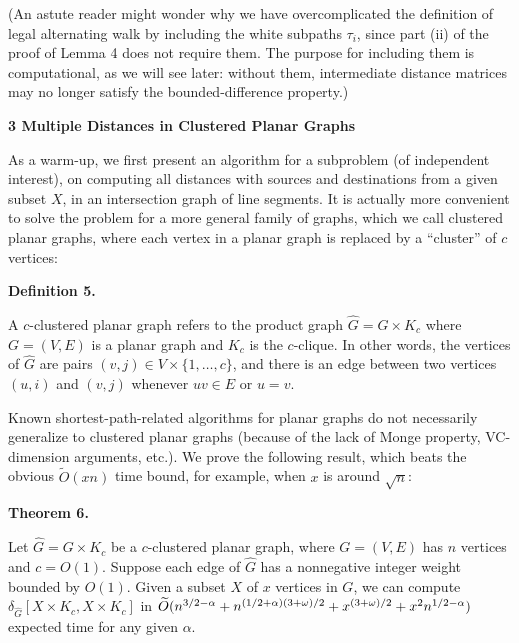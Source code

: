 (An astute reader might wonder why we have overcomplicated the definition of legal alternating walk by including the white subpaths $\tau_{i}$, since part (ii) of the proof of Lemma 4 does not require them. The purpose for including them is computational, as we will see later: without them, intermediate distance matrices may no longer satisfy the bounded-difference property.)
\par
\par
\par\medskip\noindent\textbf{3 Multiple Distances in Clustered Planar Graphs}\par
As a warm-up, we first present an algorithm for a subproblem (of independent interest), on computing all distances with sources and destinations from a given subset $X$, in an intersection graph of line segments. It is actually more convenient to solve the problem for a more general family of graphs, which we call clustered planar graphs, where each vertex in a planar graph is replaced by a “cluster” of $c$ vertices:
\par
\par
\par\medskip\noindent\textbf{Definition 5.}\par
A $c$-clustered planar graph refers to the product graph ${\widehat{G}}=G\times K_{c}$ where $G=(V,E)$ is a planar graph and $K_{c}$ is the $c$-clique. In other words, the vertices of ${\widehat{G}}$ are pairs $(v,j)\in V\times\{1,\ldots,c\}$, and there is an edge between two vertices $(u,i)$ and $(v,j)$ whenever $uv\in E$ or $u=v$.
\par
\par
\par
Known shortest-path-related algorithms for planar graphs do not necessarily generalize to clustered planar graphs (because of the lack of Monge property, VC-dimension arguments, etc.). We prove the following result, which beats the obvious $\widetilde{O}(xn)$ time bound, for example, when $x$ is around $\sqrt{n}$:
\par
\par
\par\medskip\noindent\textbf{Theorem 6.}\par
Let ${\widehat{G}}=G\times K_{c}$ be a $c$-clustered planar graph, where $G=(V,E)$ has $n$ vertices and $c=O(1)$. Suppose each edge of ${\widehat{G}}$ has a nonnegative integer weight bounded by $O(1)$. Given a subset $X$ of $x$ vertices in $G$, we can compute $\delta_{\widehat{G}}[X\times K_{c},X\times K_{c}]$ in $\widetilde{O}(n^{3/2-\alpha}+n^{(1/2+\alpha)(3+\omega)/2}+x^{(3+\omega)/2}+x^{%
2}n^{1/2-\alpha})$ expected time for any given $\alpha$.
